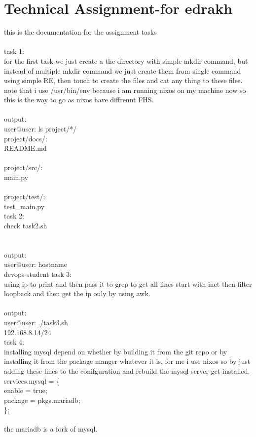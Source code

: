 \documentclass[a4paper,14pt]{extarticle}
\author{}
\date{}
\begin{document}
\noindent
\newpage

\section*{Technical Assignment-for edrakh}
this is the documentation for the assignment tasks\\
\\
task 1:\\
for the first task we just create a the directory with simple mkdir command, but instead of multiple mkdir command we just create them from single command using simple RE, then touch to create the files and cat any thing to these files.\\
note that i use /usr/bin/env because i am running nixos on my machine now so this is the way to go as nixos have diffrennt FHS.\\
\\
output:\\
user@user:  ls project/*/\\
project/docs/:\\
README.md\\
\\
project/src/:\\
main.py\\
\\
project/test/:\\
test\_main.py\\
task 2:\\
check task2.sh\\
\\
\\
output:\\
user@user:  hostname\\
devops-student
task 3:\\
using ip to print and then pass it to grep to get all lines start with inet then filter loopback and then get the ip only by using awk.\\
\\
output:\\
user@user:  ./task3.sh\\
192.168.8.14/24\\
task 4:\\
installing mysql depend on whether by building it from the git repo or by installing it from the package manger whatever it is, for me i use nixos so by just adding these lines to the conifguration and rebuild the mysql server get installed.\\
services.mysql = \{\\
  enable = true;\\
  package = pkgs.mariadb;\\
\};\\
\\
the mariadb is a fork of mysql.\\
\\

\pagestyle{empty}
\end{document}
